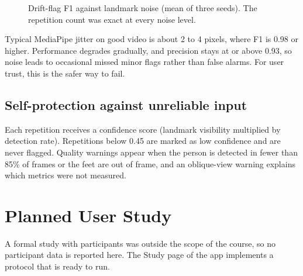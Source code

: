 \documentclass[12pt]{article}
\begin{document}
\begin{figure}[!htbp]
\centering
{}
\caption{Drift-flag F1 against landmark noise (mean of three seeds). The repetition count was exact at every noise level.}
\end{figure}

Typical MediaPipe jitter on good video is about 2 to 4 pixels, where F1 is 0.98 or higher. Performance degrades gradually, and precision stays at or above 0.93, so noise leads to occasional missed minor flags rather than false alarms. For user trust, this is the safer way to fail.

\subsection{Self-protection against unreliable input}

Each repetition receives a confidence score (landmark visibility multiplied by detection rate). Repetitions below 0.45 are marked as low confidence and are never flagged. Quality warnings appear when the person is detected in fewer than 85\% of frames or the feet are out of frame, and an oblique-view warning explains which metrics were not measured.

\section{Planned User Study}

A formal study with participants was outside the scope of the course, so no participant data is reported here. The Study page of the app implements a protocol that is ready to run.
\end{document}
